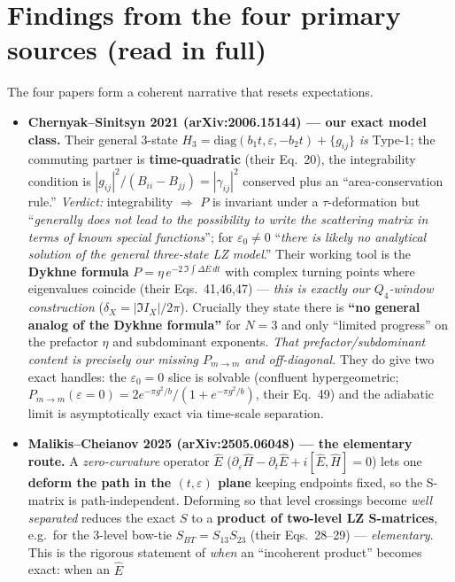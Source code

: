 \documentclass[11pt]{article}
\newcommand{\eps}{\varepsilon}
\newcommand{\Pmid}{P_{m\to m}}
\begin{document}
\section{Findings from the four primary sources (read in full)}
The four papers form a coherent narrative that resets expectations.
\begin{itemize}[nosep,leftmargin=1.4em]
\item \textbf{Chernyak--Sinitsyn 2021 (arXiv:2006.15144) --- our exact model class.} Their
  general $3$-state $H_3=\mathrm{diag}(b_1t,\eps,-b_2t)+\{g_{ij}\}$ \emph{is} Type-1; the
  commuting partner is \textbf{time-quadratic} (their Eq.~20), the integrability condition is
  $|g_{ij}|^2/(B_{ii}-B_{jj})=|\gamma_{ij}|^2$ conserved plus an ``area-conservation rule.''
  \emph{Verdict:} integrability $\Rightarrow$ $P$ is invariant under a $\tau$-deformation but
  ``\emph{generally does not lead to the possibility to write the scattering matrix in terms of
  known special functions}''; for $\eps_0\ne0$ ``\emph{there is likely no analytical solution of
  the general three-state LZ model}.'' Their working tool is the \textbf{Dykhne formula}
  $P=\eta\,e^{-2\,\Im\!\int\Delta E\,dt}$ with complex turning points where eigenvalues coincide
  (their Eqs.~41,46,47) --- \emph{this is exactly our $Q_4$-window construction}
  ($\delta_X=|\Im I_X|/2\pi$). Crucially they state there is \textbf{``no general analog of the
  Dykhne formula''} for $N{=}3$ and only ``limited progress'' on the prefactor $\eta$ and
  subdominant exponents. \emph{That prefactor/subdominant content is precisely our missing
  $\Pmid$ and off-diagonal.} They do give two exact handles: the $\eps_0=0$ slice is solvable
  (confluent hypergeometric; $P_{m\to m}(\eps{=}0)=2e^{-\pi g^2/b}/(1+e^{-\pi g^2/b})$, their
  Eq.~49) and the adiabatic limit is asymptotically exact via time-scale separation.
\item \textbf{Malikis--Cheianov 2025 (arXiv:2505.06048) --- the elementary route.} A
  \emph{zero-curvature} operator $\hat E$ ($\partial_\eps\hat H-\partial_t\hat E+i[\hat E,\hat H]=0$)
  lets one \textbf{deform the path in the $(t,\eps)$ plane} keeping endpoints fixed, so the
  S-matrix is path-independent. Deforming so that level crossings become \emph{well separated}
  reduces the exact $S$ to a \textbf{product of two-level LZ S-matrices}, e.g.\ for the
  $3$-level bow-tie $S_{BT}=S_{13}S_{23}$ (their Eqs.~28--29) --- \emph{elementary}. This is the
  rigorous statement of \emph{when} an ``incoherent product'' becomes exact: when an $\hat E$

\end{itemize}
\end{document}
